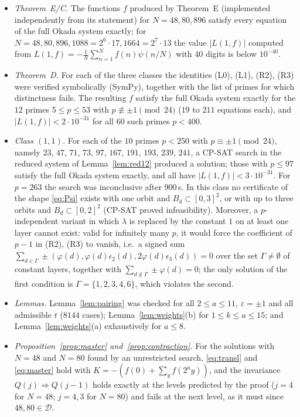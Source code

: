 \documentclass[11pt,a4paper]{article}
\theoremstyle{definition}
\theoremstyle{remark}
\newcommand{\cD}{\mathcal{D}}
\begin{document}
\begin{itemize}[leftmargin=*]
\item \emph{Theorem~E/C.} The functions $f$ produced by Theorem~E (implemented independently from its statement) for $N=48,80,896$ satisfy every equation of the full Okada system exactly; for $N=48,80,896,1088=2^6\cdot17,1664=2^7\cdot13$ the value $|L(1,f)|$ computed from $L(1,f)=-\frac1N\sum_{n=1}^Nf(n)\psi(n/N)$ with $40$ digits is below $10^{-40}$.
\item \emph{Theorem~D.} For each of the three classes the identities (L0), (L1), (R2), (R3) were verified symbolically (SymPy), together with the list of primes for which distinctness fails. The resulting $f$ satisfy the full Okada system exactly for the $12$ primes $5\le p\le53$ with $p\not\equiv\pm1\pmod{24}$ ($19$ to $211$ equations each), and $|L(1,f)|<2\cdot10^{-31}$ for all $60$ such primes $p<400$.
\item \emph{Class $(1,1)$.} For each of the $10$ primes $p<250$ with $p\equiv\pm1\pmod{24}$, namely $23$, $47$, $71$, $73$, $97$, $167$, $191$, $193$, $239$, $241$, a CP-SAT search in the reduced system of Lemma~\ref{lem:red12} produced a solution; those with $p\le97$ satisfy the full Okada system exactly, and all have $|L(1,f)|<3\cdot10^{-31}$. For $p=263$ the search was inconclusive after $900$\,s. In this class no certificate of the shape \eqref{eq:Psi} exists with one orbit and $B_d\subset[0,3]^2$, or with up to three orbits and $B_d\subset[0,2]^2$ (CP-SAT proved infeasibility). Moreover, a $p$-independent variant in which $\lambda$ is replaced by the constant $1$ on at least one layer cannot exist: valid for infinitely many $p$, it would force the coefficient of $p-1$ in (R2), (R3) to vanish, i.e.\ a signed sum $\sum_{d\in\Gamma}\pm(\varphi(d),\varphi(d)\epsilon_2(d),2\varphi(d)\epsilon_3(d))=0$ over the set $\Gamma\neq\emptyset$ of constant layers, together with $\sum_{d\notin\Gamma}\pm\varphi(d)=0$; the only solution of the first condition is $\Gamma=\{1,2,3,4,6\}$, which violates the second.
\item \emph{Lemmas.} Lemma~\ref{lem:pairing} was checked for all $2\le a\le11$, $\varepsilon=\pm1$ and all admissible $t$ ($8144$ cases); Lemma~\ref{lem:weights}(b) for $1\le k\le a\le15$; and Lemma~\ref{lem:weights}(a) exhaustively for $a\le8$.
\item \emph{Proposition~\ref{prop:master} and~\ref{prop:contraction}.} For the solutions with $N=48$ and $N=80$ found by an unrestricted search, \eqref{eq:transl} and \eqref{eq:master} hold with $K=-(f(0)+\sum_yf(2^ay))$, and the invariance $Q(j)\Rightarrow Q(j-1)$ holds exactly at the levels predicted by the proof ($j=4$ for $N=48$; $j=4,3$ for $N=80$) and fails at the next level, as it must since $48,80\in\cD$.
\end{itemize}
\end{document}

